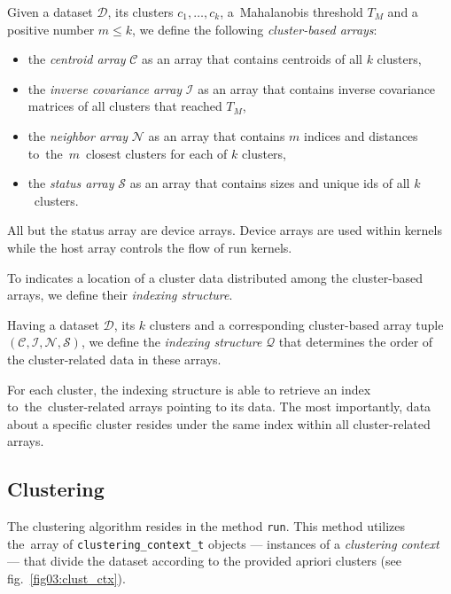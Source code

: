 \begin{defn}
	Given a dataset $\mathcal{D}$, its clusters $c_1,\dots,c_k$, a~Mahalanobis threshold $T_M$ and a positive number $m \le k$, we define the following \emph{cluster-based arrays}:
	\begin{itemize}
		\item the \emph{centroid array} $\mathcal{C}$ as an array that contains centroids of all $k$ clusters,
		\item the \emph{inverse covariance array} $\mathcal{I}$ as an array that contains inverse covariance matrices of all clusters that reached $T_M$,
		\item the \emph{neighbor array} $\mathcal{N}$ as an array that contains $m$ indices and distances to~the~$m$~closest clusters for each of $k$ clusters,
		\item the \emph{status array} $\mathcal{S}$ as an array that contains sizes and unique ids of all $k$~clusters.
	\end{itemize}
	\label{def03:tuple}
\end{defn}


All but the status array are device arrays. Device arrays are used within kernels while the host array controls the flow of run kernels.  

To indicates a location of a cluster data distributed among the cluster-based arrays, we define their \emph{indexing structure}.

\begin{defn}
	Having a dataset $\mathcal{D}$, its $k$ clusters and a corresponding cluster-based array tuple $(\mathcal{C},\mathcal{I},\mathcal{N},\mathcal{S})$, we define the \emph{indexing structure} $\mathcal{Q}$ that determines the order of the cluster-related data in these arrays.
	\label{def03:index}
\end{defn}

For each cluster, the indexing structure is able to retrieve an index to~the~clus\-ter-related arrays pointing to its data. The most importantly, data about a specific cluster resides under the same index within all cluster-related arrays.



\subsection{Clustering}
The clustering algorithm resides in the method \texttt{run}. This method utilizes the~array of \texttt{clustering\_context\_t} objects --- instances of a \emph{clustering context} --- that divide the dataset according to the provided apriori clusters (see fig.~\ref{fig03:clust_ctx}).

